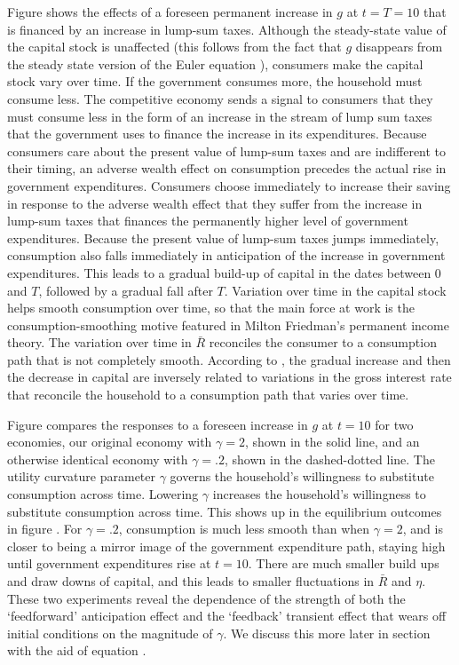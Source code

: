 \medskip
{} Figure 
shows the effects of a foreseen permanent increase in $g$ at
$t=T=10$ that is financed by an increase in lump-sum taxes.
Although the steady-state value of the capital stock is unaffected
(this follows from the fact that $g$ disappears from the steady
state version of the Euler equation ),  consumers make the
capital stock
vary  over time.    If the
government consumes more, the household must consume less.  The competitive economy
sends a signal to consumers that they must consume less in the form of an increase in
the stream of lump sum taxes that the government uses to finance the increase in its expenditures.
 Because consumers care about the present value of
lump-sum taxes and are indifferent to their timing, an
adverse wealth effect on consumption precedes the actual rise in government
expenditures.  Consumers choose immediately  to increase their
saving in response to
the adverse wealth effect that they suffer
from the increase in lump-sum taxes that finances the
permanently higher level of government expenditures. Because the present value of lump-sum
taxes jumps immediately, consumption also falls immediately in anticipation of the increase in government
expenditures. This leads to a gradual build-up of capital in the
dates between $0$ and $T$, followed by a gradual fall after $T$.
Variation over time in the capital stock helps smooth
consumption over time, so that the main force at work is  the consumption-smoothing motive featured
in Milton Friedman's permanent income theory. The variation over time
in  $\bar R$ reconciles the consumer to a consumption
path that is not completely smooth.   According to
, the gradual increase and then the decrease in
capital are inversely related to variations in the
gross interest rate that reconcile the household to a consumption path that varies over time.

Figure  compares the responses to a foreseen increase in $g$ at $t=10$ for two economies,
our original economy with $\gamma=2$, shown in the solid line,  and an otherwise identical economy with $\gamma=.2$,
shown in the dashed-dotted line.  The utility curvature parameter $\gamma$ governs the household's willingness to substitute
consumption across time. Lowering $\gamma$  increases the household's willingness to substitute consumption across time.
This shows up in the equilibrium outcomes in figure . For $\gamma=.2$, consumption is much less smooth than when $\gamma=2$, and  is closer to being
a mirror image of the government expenditure path, staying high until government expenditures rise at $t=10$. There are  much smaller build ups and draw downs of capital,
and this leads to smaller fluctuations in $\bar R$ and $\eta$.  These two experiments reveal the   dependence of the strength of both the `feedforward' anticipation effect
and the `feedback' transient effect that wears off initial conditions on the magnitude of $\gamma$.  We discuss this more later in section  with the aid of equation .


